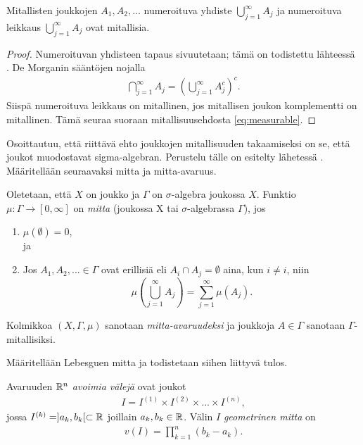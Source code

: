 \documentclass[12pt,oneside,a4paper]{amsbook} %
\begin{document}
\begin{lemma}\label{le:countableUnionAndIntersectionIsMeas}
    Mitallisten joukkojen $A_1, A_2, ...$ numeroituva yhdiste $\bigcup_{j=1}^\infty A_j$ ja numeroituva leikkaus $\bigcup_{j=1}^\infty A_j$ ovat mitallisia.
\end{lemma}
\begin{proof}
    Numeroituvan yhdisteen tapaus sivuutetaan; tämä on todistettu lähteessä \cite[s. 94]{lehrbäck}.
    De Morganin sääntöjen nojalla
    \begin{align*}
        \bigcap_{j=1}^\infty A_j = \left(\bigcup_{j=1}^\infty A_j^c\right)^c.
    \end{align*}
    Siispä numeroituva leikkaus on mitallinen, jos mitallisen joukon komplementti on mitallinen. Tämä seuraa suoraan mitallisuusehdosta \eqref{eq:measurable}.
\end{proof}

Osoittautuu, että riittävä ehto joukkojen mitallisuuden takaamiseksi on se, että joukot muodostavat sigma-algebran. Perustelu tälle on esitelty lähetessä \cite{tao}. Määritellään seuraavaksi mitta ja mitta-avaruus.

\begin{definition}
    Oletetaan, että $X$ on joukko ja $\Gamma$ on $\sigma$-algebra joukossa $X$. Funktio $\mu : \Gamma \to [0, \infty]$ on \textit{mitta} (joukossa X tai $\sigma$-algebrassa $\Gamma$), jos 
    \begin{enumerate}
        \item $\mu(\emptyset) = 0$, \\
        ja
        \item Jos $A_1, A_2, ... \in \Gamma$ ovat erillisiä eli $A_i \cap A_j = \emptyset$ aina, kun $i \ne i$, niin
        $$\mu\left(\bigcup_{j=1}^\infty A_j \right) = \sum_{j=1}^\infty \mu(A_j).$$
    \end{enumerate}
    
    Kolmikkoa $(X,\Gamma, \mu)$ sanotaan \textit{mitta-avaruudeksi} ja joukkoja $A\in \Gamma$ sanotaan $\Gamma$-mitallisiksi.
    
\end{definition}

Määritellään Lebesguen mitta ja todistetaan siihen liittyvä tulos.

\begin{definition}
    Avaruuden $\mathbb{R}^n$ \textit{avoimia välejä} ovat joukot
    \begin{align*}
        I = I^{(1)} \times I^{(2)} \times ... \times I^{(n)},
    \end{align*}
    jossa $I^{(k)} = ]a_k, b_k[ \subset \mathbb{R}$ joillain $a_k, b_k \in \mathbb{R}$.
    Välin $I$ \textit{geometrinen mitta} on
    \begin{align*}
        v(I) = \prod_{k=1}^n(b_k-a_k).
    \end{align*}
\end{definition}
\end{document}
